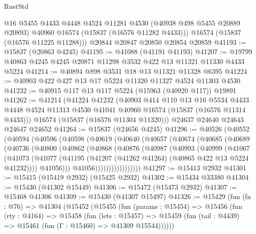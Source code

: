 \begin{lexlean}{RustStd}
\begin{coremodule}
        @16
        @5455
        @4433
        @4448
        @4524
        @11281
        @4530
        (@40938 @498 @5455 @20889 @20893)
        @40960
        @16574
        (@15837 (@16576 @11282 @4433)))
      @16574
      (@15837 (@16576 @11225 @11288)))
    @20844
    @20847
    @20850
    @20854
    @20859
@41193 := @15837 (@20863 @4245)
@41195 := @41088 (@41191 @41193)
@41207 := @19799 @40863 @4245 @4245 @20871 @11298 @3532 @422 @13 @11321 @11330 @4433 @5224
@41214 := @40894 @898 @3531 @18 @13 @11321 @11328 @6395
@41224 := @40903 @422 @427 @13 @17 @5224 @11320 @11327 @4524 @11303 @4530
@41232 := @40915 @117 @13 @117 @5224 (@15963 (@40920 @117)) @19891
@41262 := @41214
    (@41224
      @41232
      (@40903
        @414
        @110
        @13
        @16
        @5534
        @4433
        @4448
        @4524
        @11313
        @4530
        @41041
        @40960
        @16574
        (@15837 (@16576 @11314 @4433)))
      @16574
      (@15837 (@16576 @11304 @11320)))
    @24637
    @24640
    @24643
    @24647
    @24652
@41264 := @15837 (@24656 @4245)
@41296 := @40526
    (@40552
      (@40594
        (@40596
          (@40598
            (@40619
              (@40640
                (@40657
                  (@40674
                    (@40685
                      (@40689
                        (@40736
                          (@40800
                            (@40862
                              (@40868
                                (@40876
                                  (@40987
                                    (@40993
                                      (@40999
                                        (@41067
                                          (@41073
                                            (@41077
                                              (@41195
                                                (@41207
                                                  (@41262 @41264)
                                                  (@40865 @422 @13 @5224 @41232))))
                                            @41056)))
                                      @41056)))))))))))))))))
@41297 := @15413 @2932
@41301 := @15415 (@15419 @2932) (@15425 @2932)
@41302 := @15434 @33380
@41304 := @15430 (@41302 @15449)
@41306 := @15472 (@15473 @2932)
@41307 := @15468 @41306
@41309 := @15430 (@41307 @15497)
@41326 := @15429
    (fun (fn : @76) =>
    @41304
      (@15452
        (@15455
          (fun (params : @15454) =>
          @15456
            (fun (rty : @4164) =>
            @15458
              (fun (lets : @15457) =>
              @15459 (fun (tail : @4439) => @15461 (fun (Γ : @15460) => @41309 @15544))))))

\end{coremodule}
\end{lexlean}
